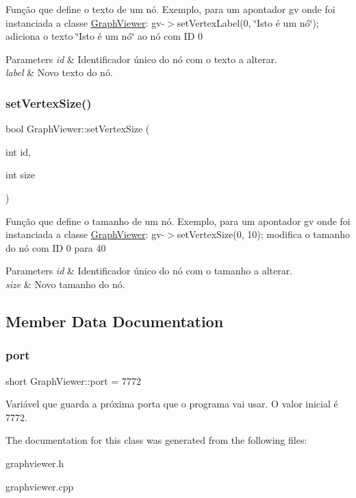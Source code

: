 Função que define o texto de um nó. Exemplo, para um apontador gv onde foi instanciada a classe \hyperlink{class_graph_viewer}{Graph\+Viewer}\+: gv-\/$>$set\+Vertex\+Label(0, \char`\"{}\+Isto é um nó\char`\"{}); adiciona o texto \char`\"{}\+Isto é um nó\char`\"{} ao nó com ID 0


\begin{DoxyParams}{Parameters}
{\em id} & Identificador único do nó com o texto a alterar. \\
\hline
{\em label} & Novo texto do nó. \\
\hline
\end{DoxyParams}
\mbox{\label{class_graph_viewer_ae930dfdfcdeb7a871eefb6028d74b9f9}} 
\subsubsection{\texorpdfstring{set\+Vertex\+Size()}{setVertexSize()}}
{\footnotesize\ttfamily bool Graph\+Viewer\+::set\+Vertex\+Size (\begin{DoxyParamCaption}\item[{int}]{id,  }\item[{int}]{size }\end{DoxyParamCaption})}

Função que define o tamanho de um nó. Exemplo, para um apontador gv onde foi instanciada a classe \hyperlink{class_graph_viewer}{Graph\+Viewer}\+: gv-\/$>$set\+Vertex\+Size(0, 10); modifica o tamanho do nó com ID 0 para 40


\begin{DoxyParams}{Parameters}
{\em id} & Identificador único do nó com o tamanho a alterar. \\
\hline
{\em size} & Novo tamanho do nó. \\
\hline
\end{DoxyParams}


\subsection{Member Data Documentation}
\mbox{\label{class_graph_viewer_a89d0abe75f41feededc49497cc514342}} 
\subsubsection{\texorpdfstring{port}{port}}
{\footnotesize\ttfamily short Graph\+Viewer\+::port = 7772\hspace{0.3cm}{\ttfamily [static]}}

Variável que guarda a próxima porta que o programa vai usar. O valor inicial é 7772. 

The documentation for this class was generated from the following files\+:\begin{DoxyCompactItemize}
\item 
graphviewer.\+h\item 
graphviewer.\+cpp\end{DoxyCompactItemize}
